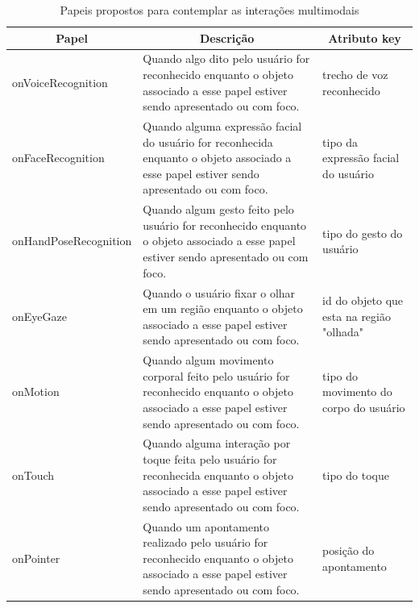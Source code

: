 \begin{table}[h]
\caption{Papeis propostos para contemplar as interações multimodais}
\label{tab:papModal}
\centering
{
  \renewcommand\arraystretch{1.25}
  \begin{tabular}{|p{}|p{}|p{}|} \hline
   \multicolumn{1}{|c|}{Papel} & \multicolumn{1}{|c|}{Descrição} & \multicolumn{1}{c|}{Atributo key}  \\ \hline 
  
    onVoiceRecognition & Quando algo dito pelo usuário for reconhecido enquanto o objeto associado a esse papel estiver sendo apresentado ou com foco. & trecho de voz reconhecido \\  \hline

    onFaceRecognition & Quando alguma expressão facial do usuário for reconhecida enquanto o objeto associado a esse papel estiver sendo apresentado ou com foco. & tipo da expressão facial do usuário \\ \hline

    onHandPoseRecognition & Quando algum gesto feito pelo usuário for reconhecido enquanto o objeto associado a esse papel estiver sendo apresentado ou com foco. & tipo do gesto do usuário \\  \hline

    onEyeGaze & Quando o usuário fixar o olhar em um região enquanto o objeto associado a esse papel estiver sendo apresentado ou com foco. & id do objeto que esta na região "olhada" \\  \hline

    onMotion & Quando algum movimento corporal feito pelo usuário for reconhecido enquanto o objeto associado a esse papel estiver sendo apresentado ou com foco. & tipo do movimento do corpo do usuário \\  \hline
    
    onTouch & Quando alguma interação por toque feita pelo usuário for reconhecida enquanto o objeto associado a esse papel estiver sendo apresentado ou com foco. & tipo do toque  \\  \hline
    
    onPointer & Quando um apontamento realizado pelo usuário for reconhecido enquanto o objeto associado a esse papel estiver sendo apresentado ou com foco. & posição do apontamento \\  \hline

  \end{tabular}
}
\end{table}

